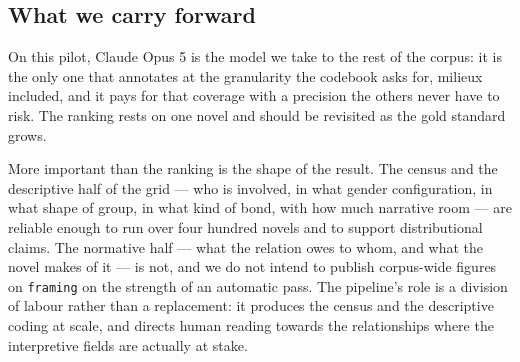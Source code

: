 \subsection{What we carry forward}

On this pilot, Claude Opus 5 is the model we take to the rest of the corpus: it
is the only one that annotates at the granularity the codebook asks for, milieux
included, and it pays for that coverage with a precision the others never have
to risk. The ranking rests on one novel and should be revisited as the gold
standard grows.

More important than the ranking is the shape of the result. The census and the
descriptive half of the grid --- who is involved, in what gender configuration,
in what shape of group, in what kind of bond, with how much narrative room ---
are reliable enough to run over four hundred novels and to support
distributional claims. The normative half --- what the relation owes to whom,
and what the novel makes of it --- is not, and we do not intend to publish
corpus-wide figures on \texttt{framing} on the strength of an automatic pass.
The pipeline's role is a division of labour rather than a replacement: it
produces the census and the descriptive coding at scale, and directs human
reading towards the relationships where the interpretive fields are actually at
stake.